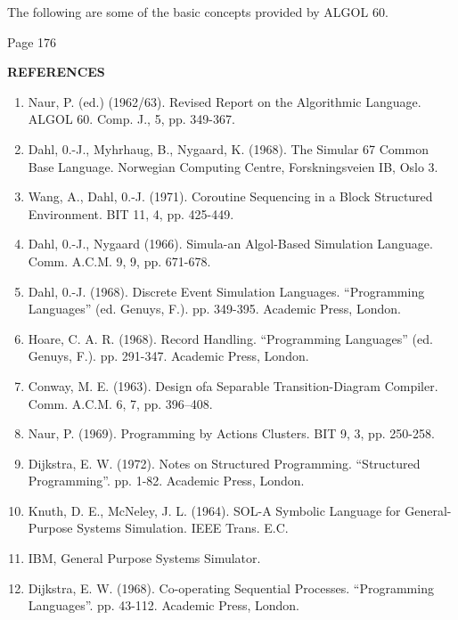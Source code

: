 The following are some of the basic concepts provided by ALGOL 60.

Page 176






\bigskip

\noindent
\textbf{REFERENCES}
\medskip

\begin{enumerate}[align=left, label=(\arabic*)]
	\item \label{ref:1}
	Naur, P. (ed.) (1962/63). Revised Report on the Algorithmic Language. ALGOL 60. Comp. J., 5, pp. 349-367.
	
	\item \label{ref:2}
	Dahl, 0.-J., Myhrhaug, B., Nygaard, K. (1968). The Simular 67 Common Base Language. Norwegian Computing Centre, Forskningsveien IB, Oslo 3.
	
	\item \label{ref:3}
	Wang, A., Dahl, 0.-J. (1971). Coroutine Sequencing in a Block Structured 	Environment. BIT 11, 4, pp. 425-449.
	
	\item \label{ref:4}
	Dahl, 0.-J., Nygaard (1966). Simula-an Algol-Based Simulation Language. Comm. A.C.M. 9, 9, pp. 671-678. 
	
	\item \label{ref:5}
	Dahl, 0.-J. (1968). Discrete Event Simulation Languages. ``Programming Languages'' (ed. Genuys, F.). pp. 349-395. Academic Press, London.
	
	\item \label{ref:6}
	Hoare, C. A. R. (1968). Record Handling. ``Programming Languages'' (ed. Genuys, F.). pp. 291-347. Academic Press, London.
	
	\item \label{ref:7}
	Conway, M. E. (1963). Design ofa Separable Transition-Diagram Compiler. Comm. A.C.M. 6, 7, pp. 396--408.
	
	\item \label{ref:8}
	Naur, P. (1969). Programming by Actions Clusters. BIT 9, 3, pp. 250-258.
	
	\item \label{ref:9}
	Dijkstra, E. W. (1972). Notes on Structured Programming. ``Structured Programming''. pp. 1-82. Academic Press, London.
	
	\item \label{ref:10}
	Knuth, D. E., McNeley, J. L. (1964). SOL-A Symbolic Language for General-Purpose Systems Simulation. IEEE Trans. E.C.
	
	\item \label{ref:11}
	IBM, General Purpose Systems Simulator.
	
	\item \label{ref:12}
	Dijkstra, E. W. (1968). Co-operating Sequential Processes. ``Programming Languages''. pp. 43-112. Academic Press, London.
\end{enumerate}